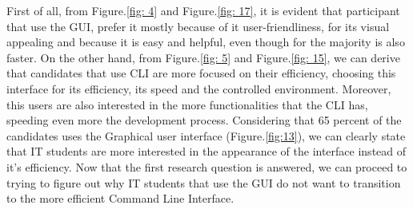 \documentclass[]{report}
\begin{document}
	First of all, from Figure.\ref{fig: 4} and Figure.\ref{fig: 17}, it is evident that participant that use the GUI, prefer it mostly because of it user-friendliness, for its visual appealing and because it is easy and helpful, even though for the majority is also faster.
	On the other hand, from Figure.\ref{fig: 5} and Figure.\ref{fig: 15}, we can derive that candidates that use CLI are more focused on their efficiency, choosing this interface for its efficiency, its speed and the controlled environment. Moreover, this users are also interested in the more functionalities that the CLI has, speeding even more the development process.
	Considering that 65  percent of the candidates uses the Graphical user interface (Figure.\ref{fig:13}), we can clearly state that IT students are more interested in the appearance of the interface instead of it's efficiency.
	Now that the first research question is answered, we can proceed to trying to figure out why IT students that use the GUI do not want to transition to the more efficient Command Line Interface.
\end{document}
